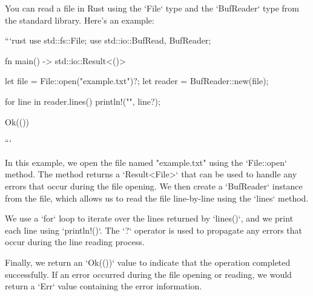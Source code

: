 You can read a file in Rust using the `File` type and the `BufReader` type from the standard library. Here's an example:

```rust
use std::fs::File;
use std::io::{BufRead, BufReader};

fn main() -> std::io::Result<()> {
    let file = File::open("example.txt")?;
    let reader = BufReader::new(file);

    for line in reader.lines() {
        println!("{}", line?);
    }

    Ok(())
}
```

In this example, we open the file named "example.txt" using the `File::open` method. The method returns a `Result<File>` that can be used to handle any errors that occur during the file opening. We then create a `BufReader` instance from the file, which allows us to read the file line-by-line using the `lines` method. 

We use a `for` loop to iterate over the lines returned by `lines()`, and we print each line using `println!()`. The `?` operator is used to propagate any errors that occur during the line reading process.

Finally, we return an `Ok(())` value to indicate that the operation completed successfully. If an error occurred during the file opening or reading, we would return a `Err` value containing the error information.
